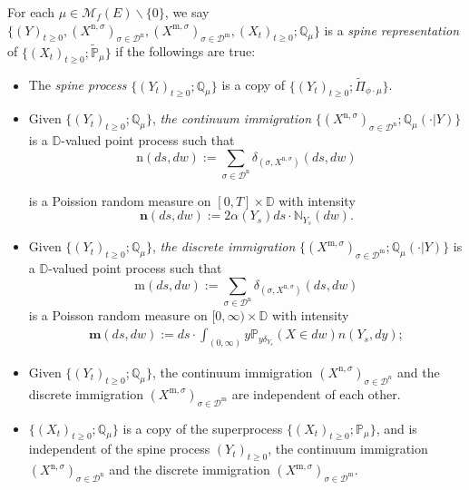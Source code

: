 \documentclass[12pt,a4paper]{amsart}
\numberwithin{equation}{section}
\theoremstyle{plain}
\theoremstyle{definition}
\theoremstyle{remark}
\begin{document}
    For each $\mu \in \mathcal M_f(E)\backslash\{0\}$,
    we say $\{(Y)_{t\geq 0}, (X^{\mathrm n, \sigma})_{\sigma\in \mathcal D^\mathrm n}, (X^{\mathrm m, \sigma})_{\sigma \in \mathcal D^\mathrm m}, (X_t)_{t\geq 0}; \mathbb Q_{\mu}\}$ is a \emph{spine representation} of $\{(X_t)_{t\geq 0}; \widetilde {\mathbb P}_\mu\}$ if the followings are true:
\begin{itemize}
\item
    The \emph{spine process} $\{(Y_t)_{t\geq 0}; \mathbb Q_\mu\}$ is a copy of $\{(Y_t)_{t\geq 0}; \widetilde \Pi_{\phi\cdot\mu}\}$.
\item
	Given $\{(Y_t)_{t\geq 0}; \mathbb Q_\mu\}$, \emph{the continuum immigration} $\{ (X^{\mathrm n,\sigma})_{\sigma \in \mathcal D^\mathrm n}; \mathbb Q_\mu(\cdot |Y)\}$ is a $\mathbb D$-valued point process such that
\[
	\mathrm n(ds,dw) := \sum_{\sigma\in \mathcal D^{\mathrm n}} \delta_{(\sigma, X^{\mathrm n,\sigma})}(ds,dw)
\]

	is a Poission random measure on $[0,T]\times \mathbb D$ with intensity
\[
	\mathbf n(ds,dw):= 2 \alpha(Y_s) ds \cdot \mathbb N_{Y_s}(dw).
\]
\item
	Given $\{(Y_t)_{t\geq 0}; \mathbb Q_\mu\}$, \emph{the discrete immigration} $\{(X^{\mathrm m,\sigma})_{\sigma\in \mathcal D^{\mathrm m}}; \mathbb Q_\mu(\cdot |Y)\}$ is a $\mathbb D$-valued point process such that
\[
	\mathrm m(ds,dw) := \sum_{\sigma\in \mathcal D^{\mathrm n}} \delta_{(\sigma, X^{\mathrm n,\sigma})}(ds,dw)
\]
	is a Poisson random measure on $[0,\infty ) \times \mathbb D$ with intensity
\begin{align}\label{eq:meanMeasImmigr}
	\mathbf m(ds,dw):= ds \cdot \int_{(0,\infty)} y \mathbb P_{y\delta_{Y_s}}(X\in dw) n(Y_s,dy);
\end{align}
\item
	Given $\{(Y_t)_{t\geq 0}; \mathbb Q_\mu\}$, the continuum immigration $(X^{\mathrm n,\sigma})_{\sigma \in \mathcal D^n}$ and the discrete immigration $(X^{\mathrm m,\sigma})_{\sigma\in \mathcal D^{\mathrm m}}$ are independent of each other.
\item
	$\{(X_t)_{t\geq 0}; \mathbb Q_\mu\}$ is a copy of the superprocess $\{(X_t)_{t\geq 0}; \mathbb P_\mu\}$, and is independent of the spine process $(Y_t)_{t\geq 0}$, the continuum immigration $(X^{\mathrm n,\sigma})_{\sigma \in \mathcal D^\mathrm n}$ and the discrete immigration $(X^{\mathrm m,\sigma})_{\sigma\in \mathcal D^{\mathrm m}}$.
\end{itemize}
\end{document}
